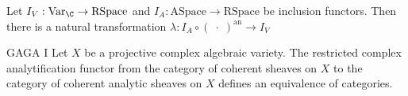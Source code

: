 \documentclass[a4paper]{article}
\begin{document}
\begin{prp}{}{} Let $I_V:\text{Var}_\C\to\text{RSpace}$ and $I_A:\text{ASpace}\to\text{RSpace}$ be inclusion functors. Then there is a natural transformation $\lambda:I_A\circ(\;\cdot\;)^\text{an}\to I_V$
\end{prp}

\begin{thm}{GAGA I}{} Let $X$ be a projective complex algebraic variety. The restricted complex analytification functor from the category of coherent sheaves on $X$ to the category of coherent analytic sheaves on $X$ defines an equivalence of categories. 
\end{thm}
\end{document}
